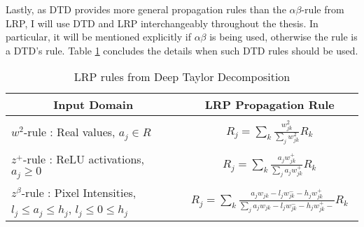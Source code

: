 Lastly, as DTD provides more general propagation rules than the $\alpha\beta$-rule from LRP, I will use DTD and LRP interchangeably throughout the thesis. In particular, it will be mentioned explicitly if $\alpha\beta$ is being used, otherwise the rule is a DTD's rule.  Table \ref{tab:lrp_deep_taylor_rules} concludes the details  when such DTD rules should be used.


\renewcommand{\arraystretch}{1}
\begin{table}[h]
\centering
\begin{tabular}{|l|l|}
\hline
\multicolumn{1}{|c|}{Input Domain} & \multicolumn{1}{c|}{LRP Propagation Rule} \\ \hline
$w^2$-rule : Real values,  $a_j \in R$ & \parbox{1cm}{
	\begin{align*}
		R_j =	\sum_k \frac{ w_{jk}^2  }{\sum_{j} w_{jk}^2}  R_k  	
    \end{align*}}
 \\ \hline
$z^+$-rule : ReLU activations, $a_j \ge 0$    & \parbox{1cm}{\begin{align*}
R_j = \sum_k  \frac{ a_j  w_{jk}^+   }{\sum_{j}  a_j w_{jk}^+  }  R_k	
\end{align*}} \\ \hline
$z^\beta$-rule : Pixel Intensities, $ l_j \le a_j \le h_j$, $l_j \le 0 \le h_j$  & \parbox{1cm}{\begin{align*}
R_j = \sum_k  \frac{ a_j  w_{jk} - l_j w_{jk}^- - h_j w_{jk}^+  }{\sum_{j}   a_j  w_{jk} - l_j w_{jk}^- - h_j w_{jk}^+  -}  R_k	
\end{align*}}
               \\ \hline
\end{tabular}
\caption{LRP rules from Deep Taylor Decomposition} %
\label{tab:lrp_deep_taylor_rules}
\end{table}
\renewcommand{\arraystretch}{1}


%
%
%
%







